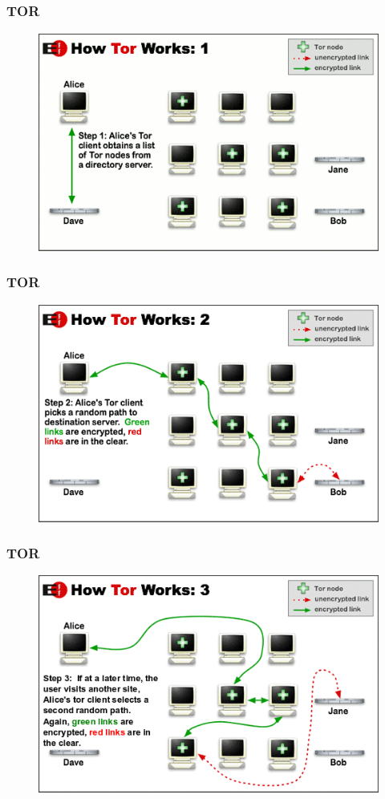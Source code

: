 \documentclass[12pt]{beamer}
\begin{document}
\subsection{}

\begin{frame}
  \frametitle{TOR}
  \begin{figure}
    \includegraphics[height=0.7\textheight]{img/tor-1.png}
  \end{figure}
\end{frame}

\begin{frame}
  \frametitle{TOR}
  \begin{figure}
    \includegraphics[height=0.7\textheight]{img/tor-2.png}
  \end{figure}
\end{frame}

\begin{frame}
  \frametitle{TOR}
  \begin{figure}
    \includegraphics[height=0.7\textheight]{img/tor-3.png}
  \end{figure}
\end{frame}
\end{document}
